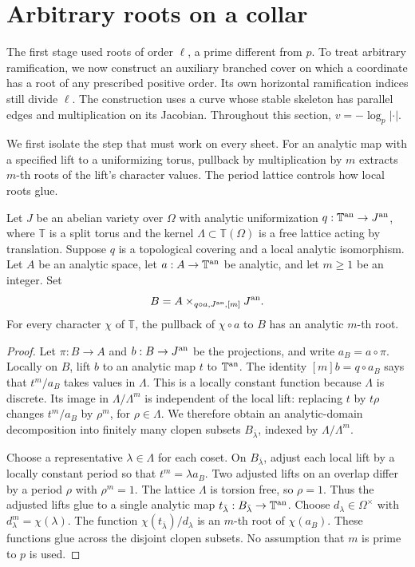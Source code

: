 \section{Arbitrary roots on a collar}\label{sec:arbitrary-roots}

The first stage used roots of order $\ell$, a prime different from $p$.
To treat arbitrary ramification, we now construct an auxiliary branched
cover on which a coordinate has a root of any prescribed positive order.
Its own horizontal ramification indices still divide $\ell$.
The construction uses a curve whose stable skeleton has parallel edges
and multiplication on its Jacobian. Throughout this section,
$v=-\log_p|\cdot|$.

We first isolate the step that must work on every sheet. For an analytic
map with a specified lift to a uniformizing torus, pullback by
multiplication by $m$ extracts $m$-th roots of the lift's character
values. The period lattice controls how local roots glue.

\begin{lemma}\label{lem:division-roots}
Let $J$ be an abelian variety over $\Omega$ with analytic uniformization
$q:\mathbb T^{\rm an}\to J^{\rm an}$, where $\mathbb T$ is a split torus
and the kernel $\Lambda\subset\mathbb T(\Omega)$ is a free lattice acting by
translation. Suppose $q$ is a topological covering and a local analytic
isomorphism. Let $A$ be an analytic space, let $a:A\to\mathbb T^{\rm an}$
be analytic, and let $m\ge1$ be an integer. Set
\[
 B=A\times_{q\circ a,J^{\rm an},[m]}J^{\rm an}.
\]
For every character $\chi$ of $\mathbb T$, the pullback of $\chi\circ a$
to $B$ has an analytic $m$-th root.
\end{lemma}

\begin{proof}
Let $\pi:B\to A$ and $b:B\to J^{\rm an}$ be the projections, and
write $a_B=a\circ\pi$. Locally on $B$, lift $b$ to an analytic map
$t$ to $\mathbb T^{\rm an}$. The identity $[m]b=q\circ a_B$ says that
$t^m/a_B$ takes values in $\Lambda$. This is a locally
constant function because $\Lambda$ is discrete. Its image in $\Lambda/\Lambda^m$ is
independent of the local lift: replacing $t$ by $t\rho$ changes $t^m/a_B$
by $\rho^m$, for $\rho\in\Lambda$. We therefore obtain an analytic-domain
decomposition into finitely many clopen subsets $B_{\bar\lambda}$,
indexed by $\Lambda/\Lambda^m$.

Choose a representative $\lambda\in\Lambda$ for each coset. On
$B_{\bar\lambda}$, adjust each local lift by a locally constant period
so that $t^m=\lambda a_B$. Two adjusted lifts on an overlap differ by a
period $\rho$ with $\rho^m=1$. The lattice $\Lambda$ is torsion free, so
$\rho=1$. Thus the adjusted lifts glue to a single analytic map
$t_{\bar\lambda}:B_{\bar\lambda}\to\mathbb T^{\rm an}$. Choose
$d_\lambda\in\Omega^\times$ with $d_\lambda^m=\chi(\lambda)$.
The function $\chi(t_{\bar\lambda})/d_\lambda$ is an $m$-th root of
$\chi(a_B)$. These functions glue across the disjoint clopen subsets.
No assumption that $m$ is prime to $p$ is used.
\end{proof}

